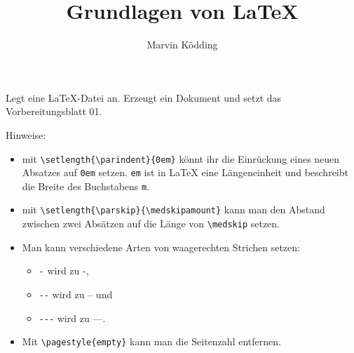 \documentclass[a4paper, 12pt]{mksheetphhd}
\title{Grundlagen von \LaTeX}
\author{Marvin Ködding}
\begin{document}
	\printtitle
	
	\vspace*{.5cm}
	
	\begin{aufgabe}
		Legt eine \LaTeX-Datei an. Erzeugt ein Dokument und setzt das Vorbereitungsblatt 01.
		
		Hinweise:
		\begin{itemize}
			\item mit \verb|\setlength{\parindent}{0em}| könnt ihr die Einrückung eines neuen Absatzes auf \verb*|0em| setzen. \verb*|em| ist in \LaTeX{} eine Längeneinheit und beschreibt die Breite des Buchstabens \verb*|m|.
			\item mit \verb|\setlength{\parskip}{\medskipamount}| kann man den Abstand zwischen zwei Absätzen auf die Länge von \verb*|\medskip| setzen.
			\item Man kann verschiedene Arten von waagerechten Strichen setzen:
			\begin{itemize}
				\item[] \verb|-| wird zu -,
				\item[] \verb|--| wird zu -- und
				\item[] \verb|---| wird zu ---.
			\end{itemize}
			\item Mit \verb|\pagestyle{empty}| kann man die Seitenzahl entfernen.
		\end{itemize}
		
	\end{aufgabe}
\end{document}
